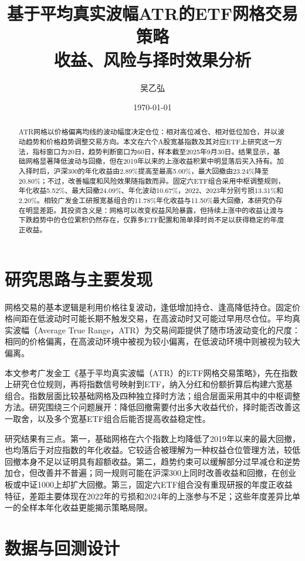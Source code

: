 \documentclass[UTF8,a4paper,11pt,fontset=fandol]{ctexart}
\title{基于平均真实波幅ATR的ETF网格交易策略\\收益、风险与择时效果分析}
\author{吴乙弘}
\date{\today}
\begin{document}
\maketitle
\begin{abstract}
ATR网格以价格偏离均线的波动幅度决定仓位：相对高位减仓、相对低位加仓，并以波动趋势和价格趋势调整交易方向。本文在六个A股宽基指数及其对应ETF上研究这一方法，指标窗口为20日，趋势判断窗口为60日，样本截至2025年9月30日。结果显示，基础网格显著降低波动与回撤，但在2019年以来的上涨收益积累中明显落后买入持有。加入择时后，沪深300的年化收益由2.89\%提高至最高5.00\%，最大回撤由23.24\%降至20.80\%；不过，改善幅度和风险效果随指数而异。固定六ETF组合采用中枢调整规则，年化收益5.52\%、最大回撤24.09\%、年化波动10.67\%，2022、2023年分别亏损13.31\%和2.20\%。相较广发金工研报宽基组合的11.78\%年化收益与11.50\%最大回撤，本研究仍存在明显差距。其投资含义是：网格可以改变权益风险暴露，但持续上涨中的收益让渡与下跌趋势中的仓位累积仍然存在，仅靠多ETF配置和简单择时尚不足以获得稳定的年度正收益。
\end{abstract}
\tableofcontents
\newpage

\section{研究思路与主要发现}
网格交易的基本逻辑是利用价格往复波动，逢低增加持仓、逢高降低持仓。固定价格间距在低波动时可能长期不触发交易，在高波动时又可能过早用尽仓位。平均真实波幅（Average True Range，ATR）为交易间距提供了随市场波动变化的尺度：相同的价格偏离，在高波动环境中被视为较小偏离，在低波动环境中则被视为较大偏离。

本文参考广发金工《基于平均真实波幅（ATR）的ETF网格交易策略》\cite{gfreport}，先在指数上研究仓位规则，再将指数信号映射到ETF，纳入分红和份额折算后构建六宽基组合。指数层面比较基础网格及四种独立择时方法；组合层面采用其中的中枢调整方法。研究围绕三个问题展开：降低回撤需要付出多大收益代价，择时能否改善这一取舍，以及多个宽基ETF组合后能否提高收益稳定性。

研究结果有三点。第一，基础网格在六个指数上均降低了2019年以来的最大回撤，也均落后于对应指数的年化收益。它较适合被理解为一种权益仓位管理方法，较低回撤本身不足以证明具有超额收益。第二，趋势约束可以缓解部分过早减仓和逆势加仓，但改善并不普遍；同一规则可能在沪深300上同时改善收益和回撤，在创业板或中证1000上却扩大回撤。第三，固定六ETF组合没有重现研报的年度正收益特征，差距主要体现在2022年的亏损和2024年的上涨参与不足；这些年度差异比单一的全样本年化收益更能揭示策略局限。

\section{数据与回测设计}
\end{document}
